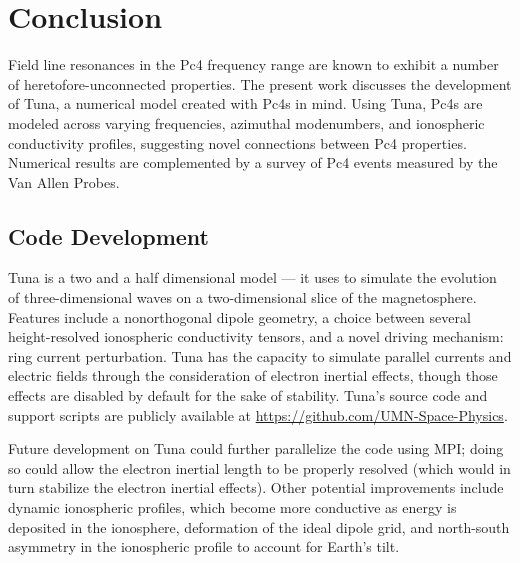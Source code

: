


\chapter{Conclusion}
  \label{ch_conclusion}

Field line resonances in the Pc4 frequency range are known to exhibit a number
of heretofore-unconnected properties. The present work discusses the
development of Tuna, a numerical model created with Pc4s in mind. Using Tuna,
Pc4s are modeled across varying frequencies, azimuthal
modenumbers, and ionospheric conductivity profiles, suggesting novel
connections between Pc4 properties. Numerical results are complemented by a
survey of Pc4 events measured by the Van Allen Probes. 

\section{Code Development}

Tuna is a two and a half dimensional model --- it uses \maxeqs to simulate the
evolution of three-dimensional \Alfven waves on a two-dimensional slice of the
magnetosphere. Features include a nonorthogonal dipole geometry, a choice
between several height-resolved ionospheric conductivity tensors, and a novel
driving mechanism: ring current perturbation. Tuna has the capacity to simulate
parallel currents and electric fields through the consideration of electron
inertial effects, though those effects are disabled by default for the sake of
stability. Tuna's source code and support scripts are publicly available at
\url{https://github.com/UMN-Space-Physics}. 

Future development on Tuna could further parallelize the code using MPI; doing
so could allow the electron inertial length to be properly resolved (which
would in turn stabilize the electron inertial effects). Other potential
improvements include dynamic ionospheric profiles, which become more
conductive as energy is deposited in the ionosphere, deformation of the ideal
dipole grid, and north-south asymmetry in the ionospheric profile to account
for Earth's tilt. 



